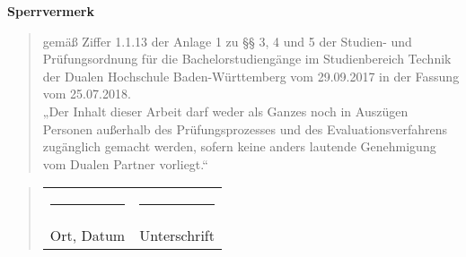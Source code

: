 \begin{titlepage}
	\begin{center}
		\vspace*{1cm}
		\Huge\bf Sperrvermerk\\
		\vspace*{2cm}
		\normalsize\rm
		\begin{quotation}
			\parbox{0.8\textwidth}{gemäß Ziffer 1.1.13 der Anlage 1 zu §§ 3, 4 und 5  der Studien- und Prüfungsordnung für die Bachelorstudiengänge im Studienbereich Technik der Dualen Hochschule Baden-Württemberg vom 29.09.2017 in der Fassung vom 25.07.2018.\\
			\newline „Der Inhalt dieser Arbeit darf weder als Ganzes noch in Auszügen Personen außerhalb des Prüfungsprozesses und des Evaluationsverfahrens zugänglich gemacht werden, sofern keine anders lautende Genehmigung vom Dualen Partner vorliegt.“}
		\end{quotation}
		\vspace*{1cm}
		\begin{quotation}
		  \parbox{0.8\textwidth}{
		  \begin{tabularx}{0.78\textwidth}{l@{\extracolsep\fill}l}
				\rule{4cm}{0.3mm}&\rule{4cm}{0.3mm}\\
	    	Ort, Datum&Unterschrift
			\end{tabularx}}
		\end{quotation}
	\end{center}
\end{titlepage}

\newpage
